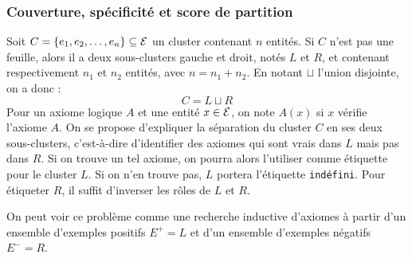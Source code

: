 \subsubsection{Couverture, spécificité et score de partition}
Soit $C = \{e_1, e_2, \ldots, e_n \} \subseteq \mathcal{E}$ un cluster contenant $n$ entités. Si $C$ n'est pas une feuille, alors il a deux sous-clusters gauche et droit, notés $L$ et $R$, et contenant respectivement $n_1$ et $n_2$ entités, avec $n = n_1 + n_2$. En notant $\sqcup$ l'union disjointe, on a donc :
\begin{equation}
C = L \sqcup R
\end{equation}
Pour un axiome logique $A$ et une entité $x \in \mathcal{E}$, on note $A(x)$ si $x$ vérifie l'axiome $A$. On se propose d'expliquer la séparation du cluster $C$ en ses deux sous-clusters, c'est-à-dire d'identifier des axiomes qui sont vrais dans $L$ mais pas dans $R$. Si on trouve un tel axiome, on pourra alors l'utiliser comme étiquette pour le cluster $L$. Si on n'en trouve pas, $L$ portera l'étiquette \texttt{indéfini}. Pour étiqueter $R$, il suffit d'inverser les rôles de $L$ et $R$.

On peut voir ce problème comme une recherche inductive d'axiomes à partir d'un ensemble d'exemples positifs $E^+ = L$ et d'un ensemble d'exemples négatifs $E^- = R$. 


